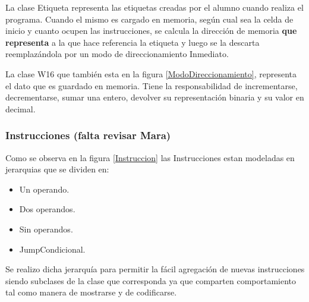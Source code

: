 La clase Etiqueta representa las etiquetas creadas por el alumno cuando realiza el programa. Cuando el mismo es cargado en memoria, según cual sea la celda de inicio y cuanto ocupen las instrucciones, se calcula la dirección de memoria \textbf{que representa }{a la que hace referencia} la etiqueta y luego se la descarta reemplazándola por un modo de direccionamiento Inmediato.

La clase W16 que también esta en la figura \ref{ModoDireccionamiento}, representa el dato que es guardado en memoria. Tiene la responsabilidad de incrementarse, decrementarse, sumar una entero, devolver su representación binaria y su valor en decimal.



\subsubsection{Instrucciones (falta revisar Mara)}
Como se observa en la figura \ref{Instruccion} las Instrucciones estan modeladas en jerarquias que se dividen en:

\begin{itemize}
\item Un operando.
\item Dos operandos.
\item Sin operandos.
\item JumpCondicional.
\end{itemize}

Se realizo dicha jerarquía para permitir la fácil agregación de nuevas instrucciones siendo subclases de la clase que corresponda ya que comparten comportamiento tal como manera de mostrarse y de codificarse.


